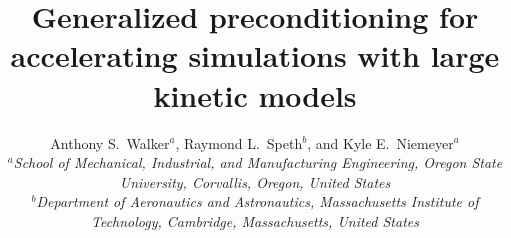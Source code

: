 \documentclass[twocolumn,10pt]{article}
\begin{document}
\title{\LARGE Generalized preconditioning for accelerating simulations with large kinetic models}

\author{{\large Anthony S.~Walker$^{a}$, Raymond L.~Speth$^{b}$, and Kyle E.~Niemeyer$^{a}$}\\[10pt]
        {\footnotesize \em $^a$School of Mechanical, Industrial, and Manufacturing Engineering, Oregon State University, Corvallis, Oregon, United States}\\
        {\footnotesize \em $^b$Department of Aeronautics and Astronautics, Massachusetts Institute of Technology, Cambridge, Massachusetts, United States}\\[-5pt]}
\date{}


\small
\baselineskip 10pt

\end{document}
